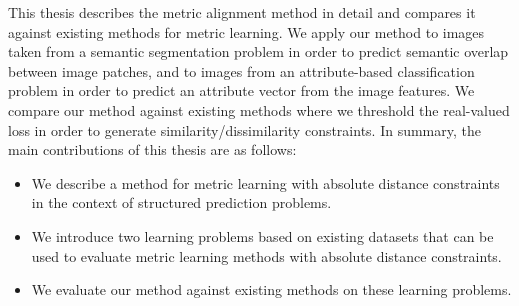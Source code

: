 This thesis describes the metric alignment method in detail and compares it against existing methods for metric learning. We apply our method to images taken from a semantic segmentation problem in order to predict semantic overlap between image patches, and to images from an attribute-based classification problem in order to predict an attribute vector from the image features. We compare our method against existing methods where we threshold the real-valued loss in order to generate similarity/dissimilarity constraints. In summary, the main contributions of this thesis are as follows:
\begin{itemize}
\item We describe a method for metric learning with absolute distance constraints in the context of structured prediction problems.
\item We introduce two learning problems based on existing datasets that can be used to evaluate metric learning methods with absolute distance constraints.
\item We evaluate our method against existing methods on these learning problems.
\end{itemize}
